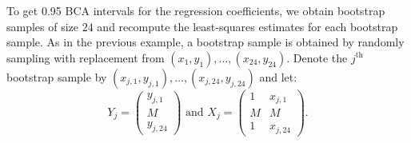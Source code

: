 To get 0.95 BCA intervals for the regression coefficients, we obtain bootstrap samples of size 24 and recompute the least-squares estimates for each bootstrap sample. As in the previous example, a bootstrap sample is obtained by randomly sampling with replacement from $(x_1,y_1),\ldots,(x_{24},y_{24})$. Denote the $j^{\textrm{th}}$ bootstrap sample by $(x_{j,1},y_{j,1}),\ldots,(x_{j,24},y_{j,24})$ and let:
$$Y_j=\left(\begin{array}{c}y_{j,1}\\M\\y_{j,24}\end{array}\right)\textrm{ and }X_j=\left(\begin{array}{cc}
1&x_{j,1}\\ M&M\\1&x_{j,24}\end{array}\right).$$


